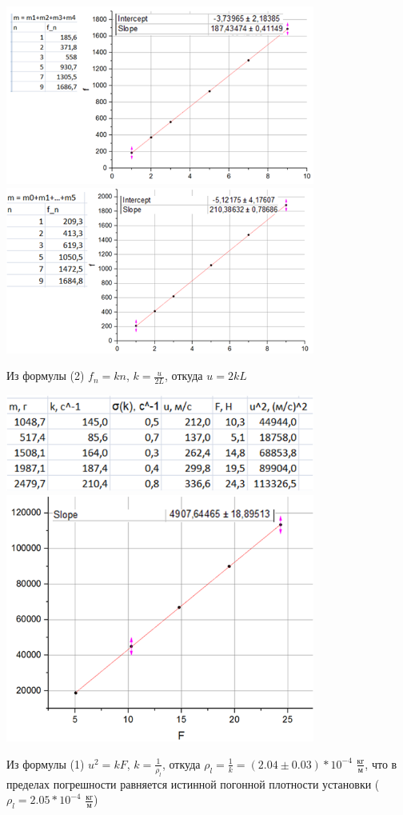 \documentclass[12pt]{article}
\begin{document}
\begin{center}
		\includegraphics[width=4in]{5_5.png}\\
		\includegraphics[width=4in]{5_6.png}\\
	\end{center}
	Из формулы (2) $f_n = kn$, $k = \frac{u}{2L}$, откуда $u = 2kL$ 
	\begin{center}
		\includegraphics[width=4in]{5_7.png}\\
		\includegraphics[width=4in]{5_8.png}\\
	\end{center}
	Из формулы (1) $u^2 = kF$, $k = \frac{1}{\rho_l}$, откуда $\rho_l = \frac{1}{k} = (2.04 \pm 0.03) * 10^{-4}$ $\frac{кг}{м}$, что в пределах погрешности равняется истинной погонной плотности установки ($\rho_l = 2.05 * 10^{-4}$ $\frac{кг}{м}$)
\end{document}

